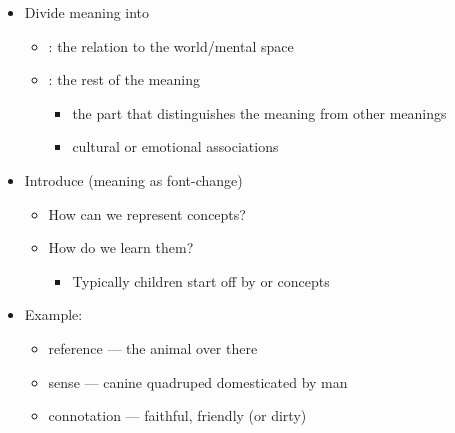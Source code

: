 \documentclass[a4paper,landscape,headrule,footrule,xetex]{foils}
\begin{document}

\begin{itemize}\addtolength{\itemsep}{-1ex}
\item Divide meaning into
  \begin{itemize}
  \item {}: the relation to the world/mental space
  \item {}: the rest of the meaning
    \begin{itemize}
    \item {} the part that distinguishes the meaning
      from other meanings
    \item {}  cultural or emotional associations 
    \end{itemize}
  \end{itemize}
\item Introduce  \hfill (meaning as font-change)
  \begin{itemize}
  \item How can we represent concepts?
  \item How do we learn them?
    \begin{itemize}
    \item Typically children start off by  or  concepts
    \end{itemize}
  \end{itemize}
\item Example: 
  \begin{itemize}
  \item reference --- the animal over there
  \item sense --- canine quadruped domesticated by man
  \item connotation --- faithful, friendly (or dirty)
  \end{itemize}
\end{itemize}




\end{document}
